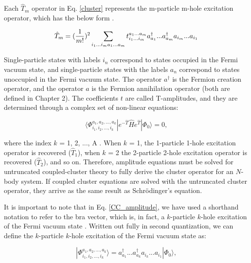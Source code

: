 Each $\hat{T}_m$ operator in Eq. \ref{cluster} represents the m-particle m-hole excitation operator, which has the below form \cite{Ref8,Ref7}.


\begin{equation} \label{m_particle_m_hole}
    \hat{T}_m = (\frac{1}{m!})^2 \sum_{i_1...i_m\\
                  a_1...a_m} t^{a_1...a_m}_{i_1...i_m} a^\dagger_{a_1}...a^\dagger_{a_m}a_{i_m}...a_{i_1}
\end{equation}

Single-particle states with labels $i_n$ correspond to states occupied in the Fermi vacuum state, and single-particle states with the labels $a_n$ correspond to states unoccupied in the Fermi vacuum state. The operator $a^\dagger$ is the Fermion creation operator, and the operator $a$ is the Fermion annihilation operator (both are defined in Chapter 2). The coefficients $t$ are called T-amplitudes, and they are determined through a complex set of non-linear equations:

\begin{equation} \label{CC_amplitude}
    \langle \Phi^{a_1, a_2, ...,a_k}_{i_1, i_2, ...,i_k} | e^{-\hat{T}}\hat{H}e^{\hat{T}} | \Phi_0 \rangle = 0,
\end{equation}

where the index $k$ = 1, 2, ..., A \cite{Ref8}. When $k$ = 1, the 1-particle 1-hole excitation operator is recovered ($\hat{T}_1$), when $k$ = 2 the 2-particle 2-hole excitation operator is recovered ($\hat{T}_2$), and so on. Therefore, amplitude equations must be solved for untruncated coupled-cluster theory to fully derive the cluster operator for an $N$-body system. If coupled cluster equations are solved with the untruncated cluster operator, they arrive as the same result as Schr\"{o}dinger's equation.

It is important to note that in Eq. \ref{CC_amplitude}, we have used a shorthand notation to refer to the bra vector, which is, in fact, a $k$-particle $k$-hole excitation of the Fermi vacuum state \cite{Ref8}. Written out fully in second quantization, we can define the $k$-particle $k$-hole excitation of the Fermi vacuum state as:

\begin{equation} \label{Fermi_excite}
    |\Phi^{a_1, a_2, ..., a_k}_{i_1, i_2, ..., i_k} \rangle = a^\dagger_{a_1} ... a^\dagger_{a_k}a_{i_k} ... a_{i_1}|\Phi_0\rangle,
\end{equation}

